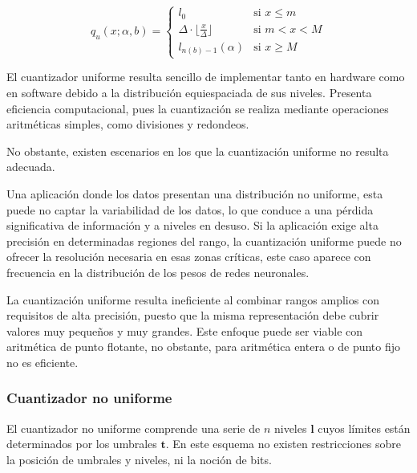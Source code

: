 \begin{equation}
    \label{eq:uniform_quantizer}
    q_u(x; \alpha, b) =
    \begin{cases}
        l_{0} & \text{si $x \leq m$} \\
        \Delta \cdot \lfloor \frac{x}{\Delta} \rfloor & \text{si } m < x < M \\
        l_{n\left(b\right) - 1}\left(\alpha\right) & \text{si } x \geq M
    \end{cases}
\end{equation}

\vspace{-0.5cm}

El cuantizador uniforme resulta sencillo de implementar tanto en hardware como en software debido a la distribución equiespaciada de sus niveles. Presenta eficiencia computacional, pues la cuantización se realiza mediante operaciones aritméticas simples, como divisiones y redondeos.

No obstante, existen escenarios en los que la cuantización uniforme no resulta adecuada.

Una aplicación donde los datos presentan una distribución no uniforme, esta puede no captar la variabilidad de los datos, lo que conduce a una pérdida significativa de información y a niveles en desuso. Si la aplicación exige alta precisión en determinadas regiones del rango, la cuantización uniforme puede no ofrecer la resolución necesaria en esas zonas críticas, este caso aparece con frecuencia en la distribución de los pesos de redes neuronales.

La cuantización uniforme resulta ineficiente al combinar rangos amplios con requisitos de alta precisión, puesto que la misma representación debe cubrir valores muy pequeños y muy grandes. Este enfoque puede ser viable con aritmética de punto flotante, no obstante, para aritmética entera o de punto fijo no es eficiente.

\subsubsection{Cuantizador no uniforme}
\label{sec:non_uniform}

El cuantizador no uniforme comprende una serie de $n$ niveles $\mathbf{l}$ cuyos límites están determinados por los umbrales $\mathbf{t}$. En este esquema no existen restricciones sobre la posición de umbrales y niveles, ni la noción de bits.

